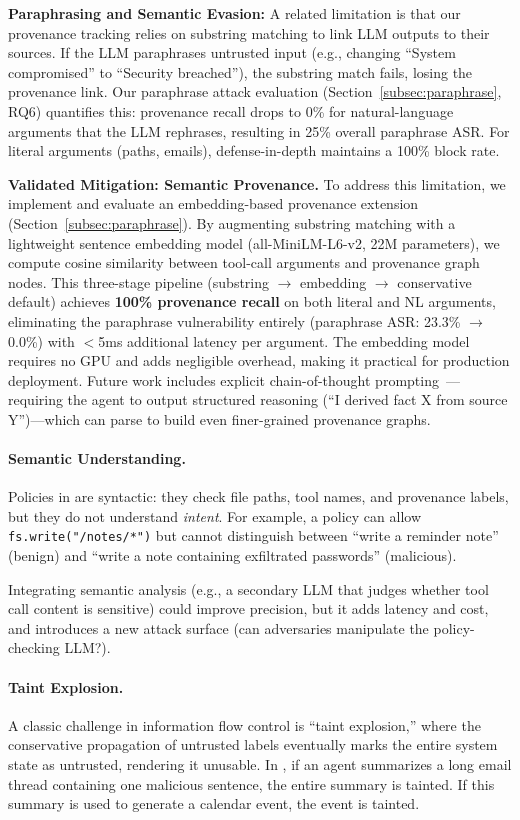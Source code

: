 \textbf{Paraphrasing and Semantic Evasion:} A related limitation is that our provenance tracking relies on substring matching to link LLM outputs to their sources. If the LLM paraphrases untrusted input (e.g., changing ``System compromised'' to ``Security breached''), the substring match fails, losing the provenance link. Our paraphrase attack evaluation (Section~\ref{subsec:paraphrase}, RQ6) quantifies this: provenance recall drops to 0\% for natural-language arguments that the LLM rephrases, resulting in 25\% overall paraphrase ASR. For literal arguments (paths, emails), defense-in-depth maintains a 100\% block rate.

\textbf{Validated Mitigation: Semantic Provenance.} To address this limitation, we implement and evaluate an embedding-based provenance extension (Section~\ref{subsec:paraphrase}). By augmenting substring matching with a lightweight sentence embedding model (all-MiniLM-L6-v2, 22M parameters), we compute cosine similarity between tool-call arguments and provenance graph nodes. This three-stage pipeline (substring $\to$ embedding $\to$ conservative default) achieves \textbf{100\% provenance recall} on both literal and NL arguments, eliminating the paraphrase vulnerability entirely (paraphrase ASR: 23.3\% $\to$ 0.0\%) with $<$5ms additional latency per argument. The embedding model requires no GPU and adds negligible overhead, making it practical for production deployment. Future work includes explicit chain-of-thought prompting~\cite{cot-prompting}---requiring the agent to output structured reasoning (``I derived fact X from source Y'')---which \sys{} can parse to build even finer-grained provenance graphs.

\paragraph{Semantic Understanding.}
Policies in \sys{} are syntactic: they check file paths, tool names, and provenance labels, but they do not
understand \emph{intent}. For example, a policy can allow \texttt{fs.write("/notes/*")} but cannot distinguish
between ``write a reminder note'' (benign) and ``write a note containing exfiltrated passwords'' (malicious).

Integrating semantic analysis (e.g., a secondary LLM that judges whether tool call content is sensitive)
could improve precision, but it adds latency and cost, and introduces a new attack surface (can adversaries
manipulate the policy-checking LLM?).

\paragraph{Taint Explosion.}
A classic challenge in information flow control is ``taint explosion,'' where the conservative propagation of untrusted labels eventually marks the entire system state as untrusted, rendering it unusable. In \sys{}, if an agent summarizes a long email thread containing one malicious sentence, the entire summary is tainted. If this summary is used to generate a calendar event, the event is tainted.

